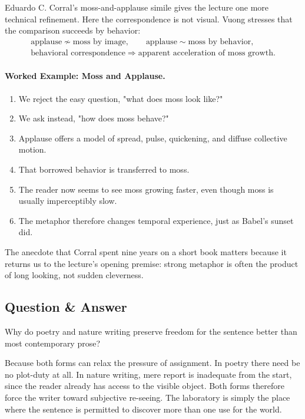 Eduardo C. Corral's moss-and-applause simile gives the lecture one more technical refinement. Here the correspondence is not visual. Vuong stresses that the comparison succeeds by behavior:
\begin{align}
\text{applause} \not\sim \text{moss by image}, \qquad \text{applause} \sim \text{moss by behavior},\\
\text{behavioral correspondence} \Longrightarrow \text{apparent acceleration of moss growth}.
\end{align}

\paragraph{Worked Example: Moss and Applause.}
\begin{enumerate}
\item We reject the easy question, "what does moss look like?"
\item We ask instead, "how does moss behave?"
\item Applause offers a model of spread, pulse, quickening, and diffuse collective motion.
\item That borrowed behavior is transferred to moss.
\item The reader now seems to see moss growing faster, even though moss is usually imperceptibly slow.
\item The metaphor therefore changes temporal experience, just as Babel's sunset did.
\end{enumerate}

The anecdote that Corral spent nine years on a short book matters because it returns us to the lecture's opening premise: strong metaphor is often the product of long looking, not sudden cleverness.

\subsection{Question \& Answer}

Why do poetry and nature writing preserve freedom for the sentence better than most contemporary prose?

Because both forms can relax the pressure of assignment. In poetry there need be no plot-duty at all. In nature writing, mere report is inadequate from the start, since the reader already has access to the visible object. Both forms therefore force the writer toward subjective re-seeing. The laboratory is simply the place where the sentence is permitted to discover more than one use for the world.

